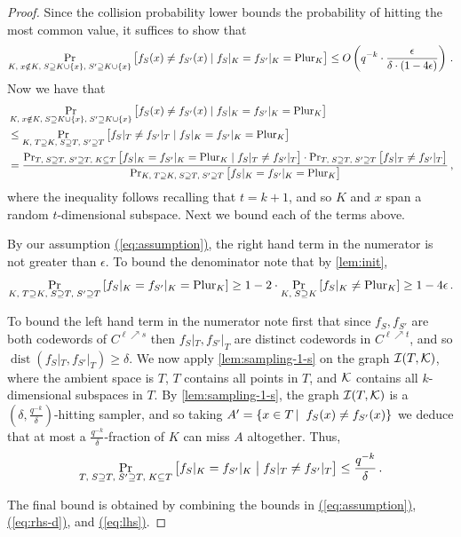 \documentclass[11pt]{article}
\numberwithin{equation}{section}
\theoremstyle{definition}
\theoremstyle{plain}
\renewcommand{\eqref}[1]{\hyperref[#1]{(\ref*{#1})}}
\theoremstyle{plain}
\DeclareMathOperator{\dist}{dist} %
\newcommand{\calI}{{\mathcal{I}}}
\newcommand{\pl}{{\rm{Plur}}}
\newcommand\sett[2]{\left\{ #1 \left| \; \vphantom{#1 #2} \right. #2  \right\}}
\begin{document}
\begin{proof}
Since the collision probability lower bounds the probability of hitting the most common value, it suffices to show that
\[ \Pr_{K,\; x \notin K, \;S \supseteq K \cup \{x\}, \;S' \supseteq K \cup \{x\}} \big[f_S(x) \neq f_{S'}(x) \mid f_S|_K =  f_{S'}|_K = \pl_K \big]  \leq O\left(  q^{-k} \cdot \frac{\epsilon} {\delta \cdot (1-4\epsilon)}\right)\,.\]
Now we have that
\begin{align*}
 &\Pr_{K, \;x\notin K,\;S \supseteq K \cup \{x\}, \;S' \supseteq K \cup \{x\}} \big[f_S(x) \neq f_{S'}(x) \mid f_S|_K =  f_{S'}|_K = \pl_K \big] \\
&\leq  \Pr_{K, \;T\supseteq K,\;S \supseteq T, \;S' \supseteq T} \big[f_S|_{T} \neq f_{S'}|_{T} \mid f_S|_K =  f_{S'}|_K = \pl_K \big] \\
& = \frac{ \Pr_{T, \;S \supseteq T, \;S' \supseteq T, \;K\subseteq T} \big[ f_S|_K =  f_{S'}|_K = \pl_{K}  \mid f_S|_{T} \neq f_{S'}|_{T} \big]  \cdot \Pr_{T,\;S \supseteq T, \;S' \supseteq T} \big[  f_S|_{T} \neq f_{S'}|_{T} \big]} {\Pr_{K, \;T\supseteq K,\;S \supseteq T, \;S' \supseteq T} \big[ f_S|_K =  f_{S'}|_{K}  = \pl_K \big] }\,, \\
\end{align*}
where the inequality follows recalling that $t=k+1$, and so $K$ and $x$ span a random $t$-dimensional subspace.
Next we bound each of the terms above.

By our assumption \eqref{eq:assumption},  the right hand term in the numerator is %
not greater than   %
$\epsilon$. To bound the denominator note that by \cref{lem:init},
\begin{equation}\label{eq:rhs-d}
\Pr_{K, \;T\supseteq K,\;S \supseteq T, \;S' \supseteq T} \left[ f_S|_K =  f_{S'}|_{K}  = \pl_K \right]  \geq  1- 2\cdot \Pr_{K, \;S \supseteq K} \left[ f_S|_K \neq \pl_K \right] \geq 1-4\epsilon\,.
\end{equation}

%
To bound the left hand term in the numerator note first that since $f_{S}, f_{S'} $ are both codewords of  $C^{\ell \nearrow s}$ then $f_{S}|_T, f_{S'}|_T$ are distinct codewords in $C^{\ell \nearrow t}$, and so
 $\dist(f_S|_T, f_{S'}|_T) \geq \delta$.
We now apply \cref{lem:sampling-1-s} on the graph $\calI(T, \cal K)$, where the ambient space is $T$,  $T$ contains all points in $T$, and $\cal K$ contains all $k$-dimensional subspaces in $T$. By \cref{lem:sampling-1-s}, the graph $\calI ( T, \cal K)$ is a $(\delta, \frac {q^{-k}} {\delta})$-hitting sampler, and so taking
$ A'=\sett{x\in T}{f_S(x)\neq f_{S'}(x)}$
we deduce that at most a $\frac{q^{-k}} \delta$-fraction of $K$ can miss $A$
altogether. Thus,
 \begin{equation}\label{eq:lhs}
 \Pr_{T, \;S \supseteq T, \;S' \supseteq T, \;K \subseteq T} \left[ f_S|_K =  f_{S'}|_K  \bigm| f_S|_{T} \neq f_{S'}|_{T} \right]  \leq \frac{q^{-k}} {\delta} \,.
 \end{equation}

 The final bound is obtained by combining the bounds in \eqref{eq:assumption}, \eqref{eq:rhs-d}, and \eqref{eq:lhs}.
\end{proof}
\end{document}
